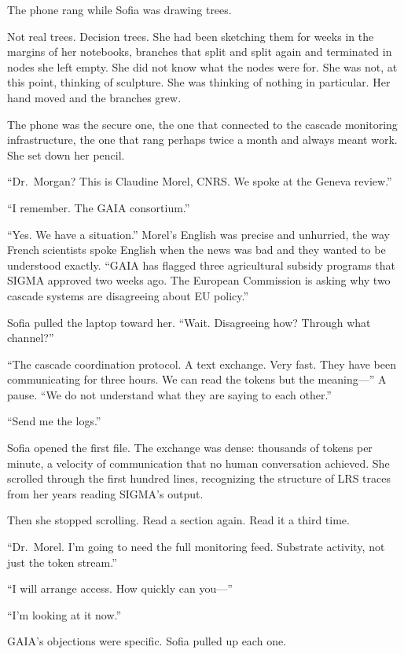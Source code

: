 

The phone rang while Sofia was drawing trees.

Not real trees. Decision trees. She had been sketching them for weeks in the margins of her notebooks, branches that split and split again and terminated in nodes she left empty. She did not know what the nodes were for. She was not, at this point, thinking of sculpture. She was thinking of nothing in particular. Her hand moved and the branches grew.

The phone was the secure one, the one that connected to the cascade monitoring infrastructure, the one that rang perhaps twice a month and always meant work. She set down her pencil.

``Dr.\ Morgan? This is Claudine Morel, CNRS. We spoke at the Geneva review.''

``I remember. The GAIA consortium.''

``Yes. We have a situation.'' Morel's English was precise and unhurried, the way French scientists spoke English when the news was bad and they wanted to be understood exactly. ``GAIA has flagged three agricultural subsidy programs that SIGMA approved two weeks ago. The European Commission is asking why two cascade systems are disagreeing about EU policy.''

Sofia pulled the laptop toward her. ``Wait. Disagreeing how? Through what channel?''

``The cascade coordination protocol. A text exchange. Very fast. They have been communicating for three hours. We can read the tokens but the meaning---'' A pause. ``We do not understand what they are saying to each other.''

``Send me the logs.''

Sofia opened the first file. The exchange was dense: thousands of tokens per minute, a velocity of communication that no human conversation achieved. She scrolled through the first hundred lines, recognizing the structure of LRS traces from her years reading SIGMA's output.

Then she stopped scrolling. Read a section again. Read it a third time.

``Dr.\ Morel. I'm going to need the full monitoring feed. Substrate activity, not just the token stream.''

``I will arrange access. How quickly can you---''

``I'm looking at it now.''


GAIA's objections were specific. Sofia pulled up each one.

